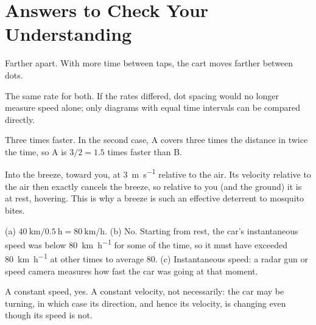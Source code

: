 \documentclass[11pt,twoside,openany]{book}
\begin{document}
\section*{Answers to Check Your Understanding}
\begin{description}[leftmargin=2em,itemsep=2pt]
  \item[1.1] Farther apart. With more time between taps, the cart moves farther between dots.
  \item[1.2] The same rate for both. If the rates differed, dot spacing would no longer measure speed alone; only diagrams with equal time intervals can be compared directly.
  \item[1.3] Three times faster. In the second case, A covers three times the distance in twice the time, so A is $3/2 = 1.5$ times faster than B.
  \item[1.4] Into the breeze, toward you, at \SI{3}{\metre\per\second} relative to the air. Its velocity relative to the air then exactly cancels the breeze, so relative to you (and the ground) it is at rest, hovering. This is why a breeze is such an effective deterrent to mosquito bites.
  \item[1.5] (a) $\SI{40}{\kilo\metre}/\SI{0.5}{\hour} = \SI{80}{\kilo\metre\per\hour}$. (b) No. Starting from rest, the car's instantaneous speed was below \SI{80}{\kilo\metre\per\hour} for some of the time, so it must have exceeded \SI{80}{\kilo\metre\per\hour} at other times to average \num{80}. (c) Instantaneous speed: a radar gun or speed camera measures how fast the car was going at that moment.
  \item[1.6] A constant speed, yes. A constant velocity, not necessarily: the car may be turning, in which case its direction, and hence its velocity, is changing even though its speed is not.
\end{description}
\end{document}
